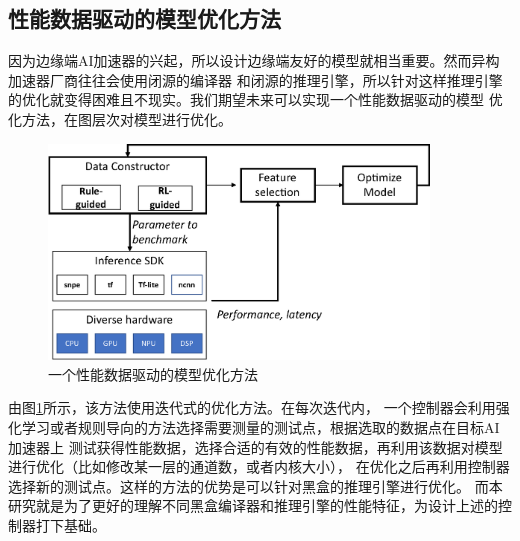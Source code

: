 \subsection{性能数据驱动的模型优化方法}
因为边缘端AI加速器的兴起，所以设计边缘端友好的模型就相当重要。然而异构加速器厂商往往会使用闭源的编译器
和闭源的推理引擎，所以针对这样推理引擎的优化就变得困难且不现实。我们期望未来可以实现一个性能数据驱动的模型
优化方法，在图层次对模型进行优化。

\begin{figure}
    \begin{center}
        \includegraphics[width=0.9\textwidth]{figure/model_opt_sys.eps}
    \end{center}
    \caption{一个性能数据驱动的模型优化方法}
    \label{fig:model opt sys}
\end{figure}

由图\ref{fig:model opt sys}所示，该方法使用迭代式的优化方法。在每次迭代内，
一个控制器会利用强化学习或者规则导向的方法选择需要测量的测试点，根据选取的数据点在目标AI加速器上
测试获得性能数据，选择合适的有效的性能数据，再利用该数据对模型进行优化（比如修改某一层的通道数，或者内核大小），
在优化之后再利用控制器选择新的测试点。这样的方法的优势是可以针对黑盒的推理引擎进行优化。
而本研究就是为了更好的理解不同黑盒编译器和推理引擎的性能特征，为设计上述的控制器打下基础。